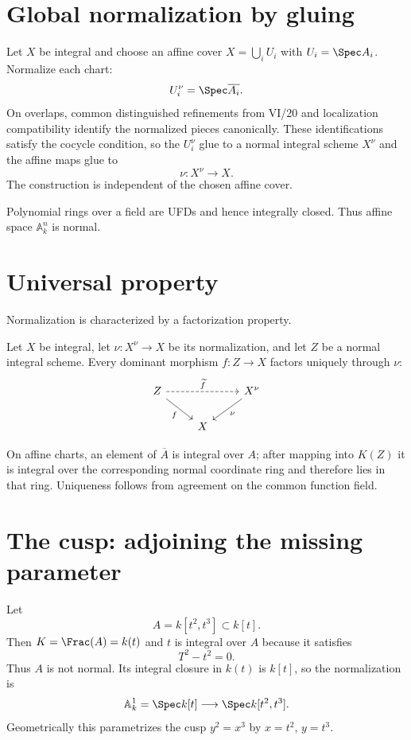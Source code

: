 \section{Global normalization by gluing}
Let $X$ be integral and choose an affine cover $X=\bigcup_i U_i$ with $U_i=\Spec A_i$.  Normalize each chart:
\[
U_i^\nu=\Spec\overline{A_i}.
\]
On overlaps, common distinguished refinements from VI/20 and localization compatibility identify the normalized
pieces canonically.  These identifications satisfy the cocycle condition, so the $U_i^\nu$ glue to a normal
integral scheme $X^\nu$ and the affine maps glue to
\[
\nu:X^\nu\to X.
\]
The construction is independent of the chosen affine cover.



\begin{example}\label{ex:vi28-expand-02}
Polynomial rings over a field are UFDs and hence integrally closed.  Thus affine space $\mathbb A^n_k$ is normal.
\end{example}
\section{Universal property}
Normalization is characterized by a factorization property.

\begin{theorem}\label{thm:vi28-universal}
Let $X$ be integral, let $\nu:X^\nu\to X$ be its normalization, and let $Z$ be a normal integral scheme.  Every
dominant morphism $f:Z\to X$ factors uniquely through $\nu$:
\[
\begin{tikzcd}
Z \arrow[rr,dashed,"\widetilde f"] \arrow[dr,"f"'] && X^\nu \arrow[dl,"\nu"]\\
& X &
\end{tikzcd}
\]
\end{theorem}

On affine charts, an element of $\overline A$ is integral over $A$; after mapping into $K(Z)$ it is integral over
the corresponding normal coordinate ring and therefore lies in that ring.  Uniqueness follows from agreement on
the common function field.



\section{The cusp: adjoining the missing parameter}
Let
\[
A=k[t^2,t^3]\subset k[t].
\]
Then $K=\Frac(A)=k(t)$ and $t$ is integral over $A$ because it satisfies
\[
T^2-t^2=0.
\]
Thus $A$ is not normal.  Its integral closure in $k(t)$ is $k[t]$, so the normalization is
\[
\mathbb A^1_k=\Spec k[t]\longrightarrow\Spec k[t^2,t^3].
\]
Geometrically this parametrizes the cusp $y^2=x^3$ by $x=t^2$, $y=t^3$.

